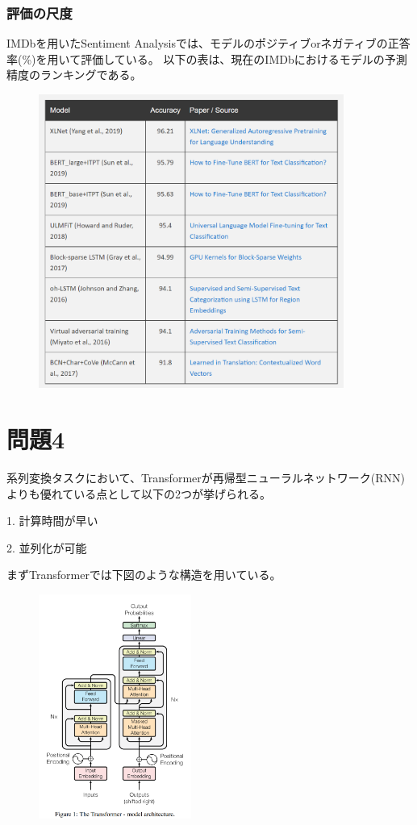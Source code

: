 \documentclass[a4j,11pt]{jarticle}
\begin{document}
\subsubsection*{評価の尺度}
IMDbを用いたSentiment Analysisでは、モデルのポジティブorネガティブの正答率(\%)を用いて評価している。
以下の表\cite{NLP-progress}は、現在のIMDbにおけるモデルの予測精度のランキングである。
\begin{figure}[hbtp]
    \centering
    \includegraphics[width=10cm]{p3-3.png}
\end{figure}

\newpage
\section{問題4}
系列変換タスクにおいて、Transformerが再帰型ニューラルネットワーク(RNN)よりも優れている点として以下の2つが挙げられる。

1. 計算時間が早い

2. 並列化が可能

まずTransformerでは下図\cite{Attention}のような構造を用いている。

\begin{figure}[hbtp]
    \centering
    \includegraphics[width=5cm]{p4-2.png}
\end{figure}
\end{document}
